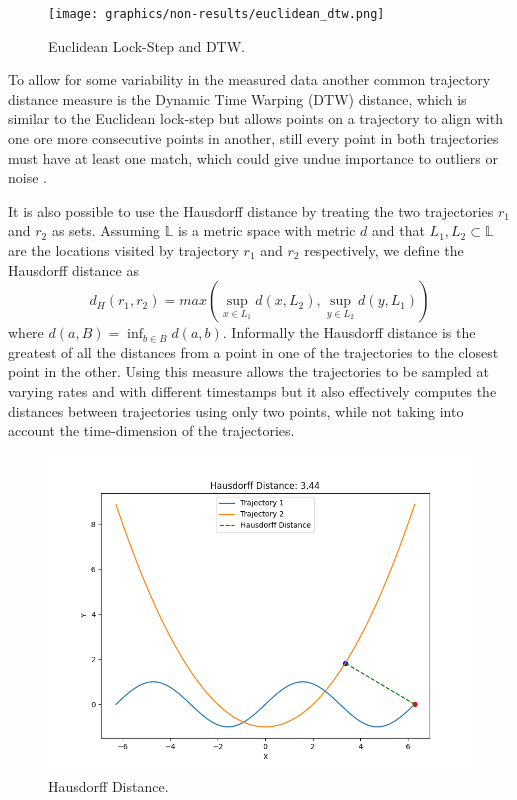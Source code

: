 \documentclass[../main.tex]{subfiles}
\begin{document}
\begin{figure}[ht]
\centering
    \begin{adjustbox}{center}
    \texttt{[image: graphics/non-results/euclidean\_dtw.png]}
    \end{adjustbox}
\caption{Euclidean Lock-Step and DTW.}
\end{figure}

To allow for some variability in the measured data another common trajectory distance measure is the Dynamic Time Warping (DTW) distance, which is similar to the Euclidean lock-step but allows points on a trajectory to align with one ore more consecutive points in another, still every point in both trajectories must have at least one match, which could give undue importance to outliers or noise \cite{su2020survey}.

It is also possible to use the Hausdorff distance by treating the
two trajectories $r_1$ and $r_2$ as sets. Assuming $\mathbb{L}$ is a metric space with metric $d$ and that $L_1, L_2 \subset \mathbb{L}$ are the locations visited by trajectory $r_1$ and $r_2$ respectively, we define the Hausdorff distance as
$$
d_H(r_1,r_2) = max(\sup_{x\in L_1}d(x, L_2), \sup_{y\in L_2}d(y, L_1))
$$
where $d(a,B) = \inf_{b\in B}d(a,b)$. Informally the Hausdorff distance is the greatest of all the distances from a point in one of the trajectories to the closest point in the other. Using this measure 
allows the trajectories to be sampled at varying rates and 
with different timestamps but it also effectively computes
the distances between trajectories using only two points, while not taking into account the time-dimension of the trajectories.

\begin{figure}[ht]
\centering
\begin{adjustbox}{center}
\includegraphics[width=1.2\textwidth]{graphics/non-results/hausdorff.png}
\end{adjustbox}
\caption{Hausdorff Distance.}
\end{figure}
\end{document}
